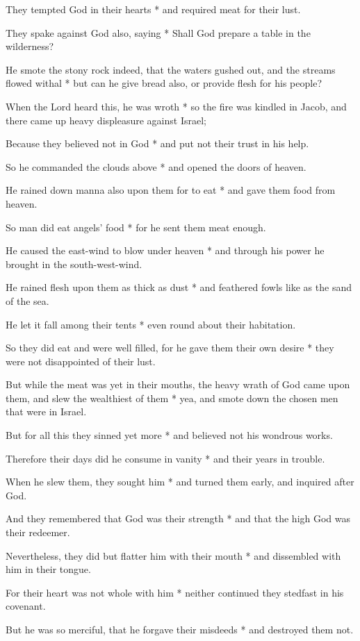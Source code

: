 They tempted God in their hearts * and required meat for their lust.

They spake against God also, saying * Shall God prepare a table in the wilderness?

He smote the stony rock indeed, that the waters gushed out, and the streams flowed withal * but can he give bread also, or provide flesh for his people?

When the Lord heard this, he was wroth * so the fire was kindled in Jacob, and there came up heavy displeasure against Israel;

Because they believed not in God * and put not their trust in his help.

So he commanded the clouds above * and opened the doors of heaven.

He rained down manna also upon them for to eat * and gave them food from heaven.

So man did eat angels' food * for he sent them meat enough.

He caused the east-wind to blow under heaven * and through his power he brought in the south-west-wind.

He rained flesh upon them as thick as dust * and feathered fowls like as the sand of the sea.

He let it fall among their tents * even round about their habitation.

So they did eat and were well filled, for he gave them their own desire * they were not disappointed of their lust.

But while the meat was yet in their mouths, the heavy wrath of God came upon them, and slew the wealthiest of them * yea, and smote down the chosen men that were in Israel.

But for all this they sinned yet more * and believed not his wondrous works.

Therefore their days did he consume in vanity * and their years in trouble.

When he slew them, they sought him * and turned them early, and inquired after God.

And they remembered that God was their strength * and that the high God was their redeemer.

Nevertheless, they did but flatter him with their mouth * and dissembled with him in their tongue.

For their heart was not whole with him * neither continued they stedfast in his covenant.

But he was so merciful, that he forgave their misdeeds * and destroyed them not.

